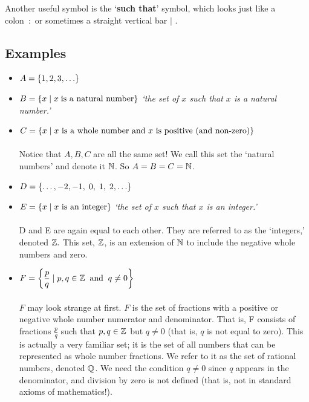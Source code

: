 \noindent Another useful symbol is the `\textbf{such that}' symbol, which looks just like a colon~:~or sometimes a straight vertical bar $|$ \label{symbcolon} \label{symbmid}.

\subsection{Examples} \label{rational}
\begin{itemize}
\item
$A = \left\{1,2,3,\ldots\right\}$
\item
$B = \left\{x \mid x \; \text{is a natural number}\right\}$ \hspace{0.5cm} \textit{`the set of $x$ such that $x$ is a natural number.'}
\item
$C = \left\{x \mid \text{$x$ is a whole number and $x$ is positive (and non-zero)}\right\}$ \\ \\
Notice that $A,B,C$ are all the same set! We call this set the `natural numbers' \label{natural number} and denote it $\mathbb{N}$. \label{symbN} So $A = B = C = \mathbb{N}$.
\item
$D = \left\{\ldots,-2,-1,\;0,\;1,\;2,\ldots\right\}$
\item
$E = \left\{x \mid \text{$x$ is an integer}\right\}$ \hspace{1cm} \textit{`the set of $x$ such that $x$ is an integer.'} \\ \\
D and E are again equal to each other. They are referred to as the `integers,' \label{integer} denoted $\mathbb{Z}.$ \label{symbZ} This set, $\mathbb{Z}$, is an extension of $\mathbb{N}$ to include the negative whole numbers and zero.
\item
$F = \left\{\displaystyle{\frac{p}{q}} \mid p,q \in \mathbb{Z} \;\; \text{and} \;\; q \neq 0\right\}$ \\ \\ 
$F$ may look strange at first. $F$ is the set of fractions with a positive or negative whole number numerator and denominator. That is, F consists of fractions $\frac{p}{q}$ such that $p,q \in \mathbb{Z}$ but $q \neq 0$ (that is, $q$ is not equal to zero). \label{symbneq} This is actually a very familiar set; it is the set of all numbers that can be represented as whole number fractions. We refer to it as the set of rational numbers, \label{rational number} denoted $\mathbb{Q}$. \label{symbQ} We need the condition $q \neq 0$ since $q$ appears in the denominator, and division by zero is not defined (that is, not in standard axioms of mathematics!).
\end{itemize}



